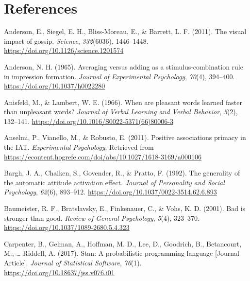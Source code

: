 \documentclass[
  man]{apa6}
\newlength{\cslhangindent}
\newlength{\cslentryspacingunit} %
\newenvironment{CSLReferences}[2] %
 {%
  \setlength{\parindent}{0pt}
  \ifodd #1
  \let\oldpar\par
  \def\par{\hangindent=\cslhangindent\oldpar}
  \fi
  \setlength{\parskip}{#2\cslentryspacingunit}
 }%
 {}
\begin{document}
\hypertarget{references}{%
\section{References}\label{references}}

\begingroup
\setlength{\parindent}{-0.5in}
\setlength{\leftskip}{0.5in}

\hypertarget{refs}{}
\begin{CSLReferences}{1}{0}
\leavevmode{}%
Anderson, E., Siegel, E. H., Bliss-Moreau, E., \& Barrett, L. F. (2011). The visual impact of gossip. \emph{Science}, \emph{332}(6036), 1446--1448. \url{https://doi.org/10.1126/science.1201574}

\leavevmode{}%
Anderson, N. H. (1965). Averaging versus adding as a stimulus-combination rule in impression formation. \emph{Journal of Experimental Psychology}, \emph{70}(4), 394--400. \url{https://doi.org/10.1037/h0022280}

\leavevmode{}%
Anisfeld, M., \& Lambert, W. E. (1966). When are pleasant words learned faster than unpleasant words? \emph{Journal of Verbal Learning and Verbal Behavior}, \emph{5}(2), 132--141. \url{https://doi.org/10.1016/S0022-5371(66)80006-3}

\leavevmode{}%
Anselmi, P., Vianello, M., \& Robusto, E. (2011). Positive associations primacy in the {IAT}. \emph{Experimental Psychology}. Retrieved from \url{https://econtent.hogrefe.com/doi/abs/10.1027/1618-3169/a000106}

\leavevmode{}%
Bargh, J. A., Chaiken, S., Govender, R., \& Pratto, F. (1992). The generality of the automatic attitude activation effect. \emph{Journal of Personality and Social Psychology}, \emph{62}(6), 893--912. \url{https://doi.org/10.1037/0022-3514.62.6.893}

\leavevmode{}%
Baumeister, R. F., Bratslavsky, E., Finkenauer, C., \& Vohs, K. D. (2001). Bad is stronger than good. \emph{Review of General Psychology}, \emph{5}(4), 323--370. \url{https://doi.org/10.1037/1089-2680.5.4.323}

\leavevmode{}%
Carpenter, B., Gelman, A., Hoffman, M. D., Lee, D., Goodrich, B., Betancourt, M., \ldots{} Riddell, A. (2017). Stan: A probabilistic programming language {[}Journal Article{]}. \emph{Journal of Statistical Software}, \emph{76}(1). \url{https://doi.org/10.18637/jss.v076.i01}


\end{CSLReferences}
\end{document}
